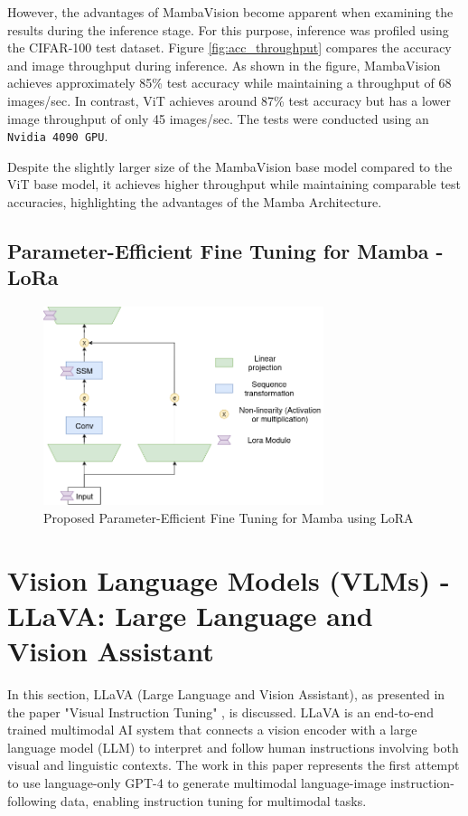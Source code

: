 \documentclass[12pt, conference, compsoc, onecolumn]{IEEEtran}
\begin{document}
	However, the advantages of MambaVision become apparent when examining the results during the inference stage. For this purpose, inference was profiled using the CIFAR-100 test dataset. Figure \ref{fig:acc_throughput} compares the accuracy and image throughput during inference. As shown in the figure, MambaVision achieves approximately 85\% test accuracy while maintaining a throughput of 68 images/sec. In contrast, ViT achieves around 87\% test accuracy but has a lower image throughput of only 45 images/sec. The tests were conducted using an \texttt{Nvidia 4090 GPU}.
	
	Despite the slightly larger size of the MambaVision base model compared to the ViT base model, it achieves higher throughput while maintaining comparable test accuracies, highlighting the advantages of the Mamba Architecture.
	
	\subsection{Parameter-Efficient Fine Tuning for Mamba - LoRa}
	\begin{figure}[H]
		\centering
		\includegraphics[width=0.73\textwidth]{figures/lora_mamba.png}
		\caption{Proposed Parameter-Efficient Fine Tuning for Mamba using LoRA}
		\label{fig:lora_mamba}
	\end{figure}
	
	\newpage
	\section{Vision Language Models (VLMs) - LLaVA: Large Language and Vision Assistant}
	
	In this section, LLaVA (Large Language and Vision Assistant), as presented in the paper "Visual Instruction Tuning" \cite{liu2023llava}, is discussed. LLaVA is an end-to-end trained multimodal AI system that connects a vision encoder with a large language model (LLM) to interpret and follow human instructions involving both visual and linguistic contexts. The work in this paper represents the first attempt to use language-only GPT-4 to generate multimodal language-image instruction-following data, enabling instruction tuning for multimodal tasks.
	
\end{document}
